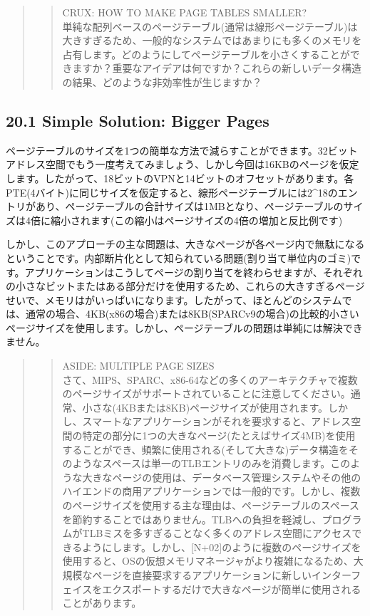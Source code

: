 \begin{quote}
\begin{quote}
CRUX: HOW TO MAKE PAGE TABLES SMALLER?\\
単純な配列ベースのページテーブル(通常は線形ページテーブル)は大きすぎるため、一般的なシステムではあまりにも多くのメモリを占有します。どのようにしてページテーブルを小さくすることができますか？重要なアイデアは何ですか？これらの新しいデータ構造の結果、どのような非効率性が生じますか？
\end{quote}
\end{quote}

\hypertarget{simple-solution-bigger-pages}{%
\subsection*{20.1 Simple Solution: Bigger
Pages}\label{simple-solution-bigger-pages}}

ページテーブルのサイズを1つの簡単な方法で減らすことができます。32ビットアドレス空間でもう一度考えてみましょう、しかし今回は16KBのページを仮定します。したがって、18ビットのVPNと14ビットのオフセットがあります。各PTE(4バイト)に同じサイズを仮定すると、線形ページテーブルには2\^{}18のエントリがあり、ページテーブルの合計サイズは1MBとなり、ページテーブルのサイズは4倍に縮小されます(この縮小はページサイズの4倍の増加と反比例です)

しかし、このアプローチの主な問題は、大きなページが各ページ内で無駄になるということです。内部断片化として知られている問題(割り当て単位内のゴミ)です。アプリケーションはこうしてページの割り当てを終わらせますが、それぞれの小さなビットまたはある部分だけを使用するため、これらの大きすぎるページせいで、メモリはがいっぱいになります。したがって、ほとんどのシステムでは、通常の場合、4KB(x86の場合)または8KB(SPARCv9の場合)の比較的小さいページサイズを使用します。しかし、ページテーブルの問題は単純には解決できません。

\begin{quote}
\begin{quote}
ASIDE: MULTIPLE PAGE SIZES\\
さて、MIPS、SPARC、x86-64などの多くのアーキテクチャで複数のページサイズがサポートされていることに注意してください。通常、小さな(4KBまたは8KB)ページサイズが使用されます。しかし、スマートなアプリケーションがそれを要求すると、アドレス空間の特定の部分に1つの大きなページ(たとえばサイズ4MB)を使用することができ、頻繁に使用される(そして大きな)データ構造をそのようなスペースは単一のTLBエントリのみを消費します。このような大きなページの使用は、データベース管理システムやその他のハイエンドの商用アプリケーションでは一般的です。しかし、複数のページサイズを使用する主な理由は、ページテーブルのスペースを節約することではありません。TLBへの負担を軽減し、プログラムがTLBミスを多すぎることなく多くのアドレス空間にアクセスできるようにします。しかし、{[}N+02{]}のように複数のページサイズを使用すると、OSの仮想メモリマネージャがより複雑になるため、大規模なページを直接要求するアプリケーションに新しいインターフェイスをエクスポートするだけで大\hspace{0pt}\hspace{0pt}きなページが簡単に使用されることがあります。
\end{quote}
\end{quote}

